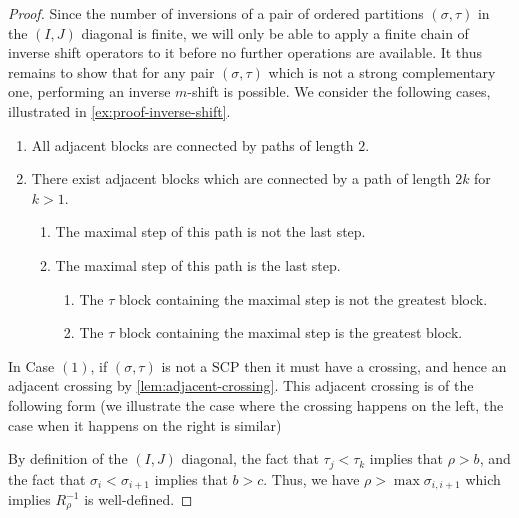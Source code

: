 \documentclass{amsart}
\theoremstyle{definition}
\newcommand{\SCP}{\mathrm{SCP}}
\begin{document}
\begin{proof}
Since the number of inversions of a pair of ordered partitions $(\sigma,\tau)$ in the $(I,J)$ diagonal is finite, we will only be able to apply a finite chain of inverse shift operators to it before no further operations are available. 
It thus remains to show that for any pair $(\sigma,\tau)$ which is not a strong complementary one, performing an inverse $m$-shift is possible. 
We consider the following cases, illustrated in \cref{ex:proof-inverse-shift}.
\begin{enumerate}
    \item All adjacent blocks are connected by paths of length $2$.
    \item There exist adjacent blocks which are connected by a path of length $2k$ for $k>1$.
    \begin{enumerate}
        \item The maximal step of this path is not the last step.
        \item The maximal step of this path is the last step.
        \begin{enumerate}
            \item The $\tau$ block containing the maximal step is not the greatest block.
            \item The $\tau$ block containing the maximal step is the greatest block.
        \end{enumerate}
    \end{enumerate}
\end{enumerate}
In Case $(1)$, if $(\sigma,\tau)$ is not a $\SCP$ then it must have a crossing, and hence an adjacent crossing by \cref{lem:adjacent-crossing}. 
This adjacent crossing is of the following form (we illustrate the case where the crossing happens on the left, the case when it happens on the right is similar) 
\begin{center}
\quad
{}
\quad
{}
\end{center}
By definition of the $(I,J)$ diagonal, the fact that $\tau_j < \tau_k$ implies that $\rho > b$, and the fact that $\sigma_i < \sigma_{i+1}$ implies that $b>c$.
Thus, we have $\rho > \max \sigma_{i,i+1}$ which implies $R_\rho^{-1}$ is well-defined.


\end{proof}
\end{document}
